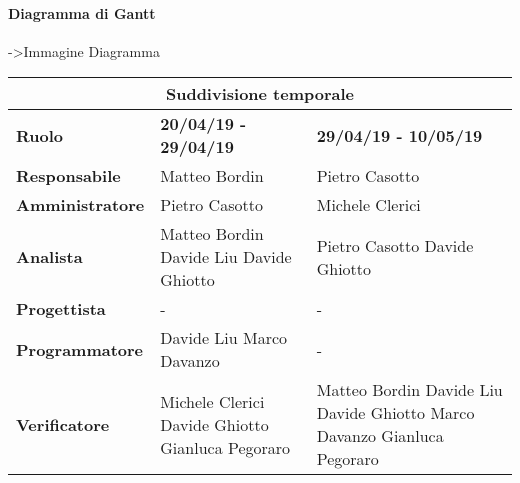 	\paragraph{Diagramma di Gantt}
	->Immagine Diagramma
	
	\begin{tabular}{|l|l|l|}
		\hline
		\multicolumn{3}{|c|}{\textbf{Suddivisione temporale}}\\
		\hline
		\textbf{Ruolo} & \textbf{20/04/19 - 29/04/19} & \textbf{29/04/19 - 10/05/19} \\
		\hline
		\textbf{Responsabile} & Matteo Bordin  & Pietro Casotto   \\
		\hline
		\textbf{Amministratore} & Pietro Casotto & Michele Clerici \\
		\hline
		\textbf{Analista} & Matteo Bordin Davide Liu Davide Ghiotto & Pietro Casotto Davide Ghiotto \\
		\hline
		\textbf{Progettista} & - & - \\
		\hline
		\textbf{Programmatore} & Davide Liu Marco Davanzo & - \\
		\hline
		\textbf{Verificatore} & Michele Clerici Davide Ghiotto Gianluca Pegoraro & Matteo Bordin Davide Liu Davide Ghiotto Marco Davanzo Gianluca Pegoraro \\
		\hline
	\end{tabular}

	
